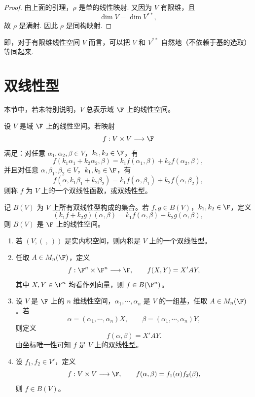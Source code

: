 \begin{proof}
	由上面的引理，$\rho$ 是单的线性映射. 又因为 $V$ 有限维，且
	\[
	\dim V=\dim V^{**},
	\]
	故 $\rho$ 是满射. 因此 $\rho$ 是同构映射.
\end{proof}

即，对于有限维线性空间 $V$ 而言，可以把 $V$ 和 $V^{**}$ 自然地（不依赖于基的选取）等同起来.


\section{双线性型}

本节中，若未特别说明，$V$ 总表示域 $\F$ 上的线性空间。

\begin{definition}[双线性型]
	设 $V$ 是域 $\F$ 上的线性空间。若映射
	\[
	f:V\times V\longrightarrow \F
	\]
	满足：对任意 $\alpha_1,\alpha_2,\beta\in V$，$k_1,k_2\in\F$，有
	\[
	f(k_1\alpha_1+k_2\alpha_2,\beta)
	=k_1f(\alpha_1,\beta)+k_2f(\alpha_2,\beta),
	\]
	并且对任意 $\alpha,\beta_1,\beta_2\in V$，$k_1,k_2\in\F$，有
	\[
	f(\alpha,k_1\beta_1+k_2\beta_2)
	=k_1f(\alpha,\beta_1)+k_2f(\alpha,\beta_2),
	\]
	则称 $f$ 为 $V$ 上的一个双线性函数，或双线性型。
	
	记 $B(V)$ 为 $V$ 上所有双线性型构成的集合。若 $f,g\in B(V)$，$k_1,k_2\in\F$，定义
	\[
	(k_1f+k_2g)(\alpha,\beta)=k_1f(\alpha,\beta)+k_2g(\alpha,\beta),
	\]
	则 $B(V)$ 是 $\F$ 上的线性空间。
\end{definition}



\begin{example}
	\begin{enumerate}
		\item 若 $(V,(\ ,\ ))$ 是实内积空间，则内积是 $V$ 上的一个双线性型。
		\item 任取 $A\in M_n(\F)$，定义
		\[
		f:\F^n\times\F^n\longrightarrow\F,
		\qquad
		f(X,Y)=X'AY,
		\]
		其中 $X,Y\in\F^n$ 均看作列向量，则 $f\in B(\F^n)$。
		\item 设 $V$ 是 $\F$ 上的 $n$ 维线性空间，$\alpha_1,\cdots,\alpha_n$ 是 $V$ 的一组基，任取 $A\in M_n(\F)$。若
		\[
		\alpha=(\alpha_1,\cdots,\alpha_n)X,
		\qquad
		\beta=(\alpha_1,\cdots,\alpha_n)Y,
		\]
		则定义
		\[
		f(\alpha,\beta)=X'AY .
		\]
		由坐标唯一性可知 $f$ 是 $V$ 上的双线性型。
		\item 设 $f_1,f_2\in V'$，定义
		\[
		f:V\times V\longrightarrow\F,
		\qquad
		f(\alpha,\beta)=f_1(\alpha)f_2(\beta),
		\]
		则 $f\in B(V)$。
	\end{enumerate}
\end{example}

